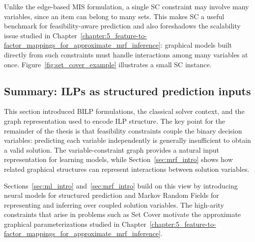 Unlike the edge-based MIS formulation, a single SC constraint may involve many variables, since an item can belong to many sets. This makes SC a useful benchmark for feasibility-aware prediction and also foreshadows the scalability issue studied in Chapter~\ref{chapter:5_feature-to-factor_mappings_for_approximate_mrf_inference}: graphical models built directly from such constraints must handle interactions among many variables at once. Figure~\ref{fig:set_cover_example} illustrates a small SC instance.



\subsection{Summary: ILPs as structured prediction inputs}

This section introduced BILP formulations, the classical solver context, and the graph representation used to encode ILP structure. The key point for the remainder of the thesis is that feasibility constraints couple the binary decision variables: predicting each variable independently is generally insufficient to obtain a valid solution. The variable-constraint graph provides a natural input representation for learning models, while Section~\ref{sec:mrf_intro} shows how related graphical structures can represent interactions between solution variables.

Sections~\ref{sec:ml_intro} and~\ref{sec:mrf_intro} build on this view by introducing neural models for structured prediction and Markov Random Fields for representing and inferring over coupled solution variables. The high-arity constraints that arise in problems such as Set Cover motivate the approximate graphical parameterizations studied in Chapter~\ref{chapter:5_feature-to-factor_mappings_for_approximate_mrf_inference}.